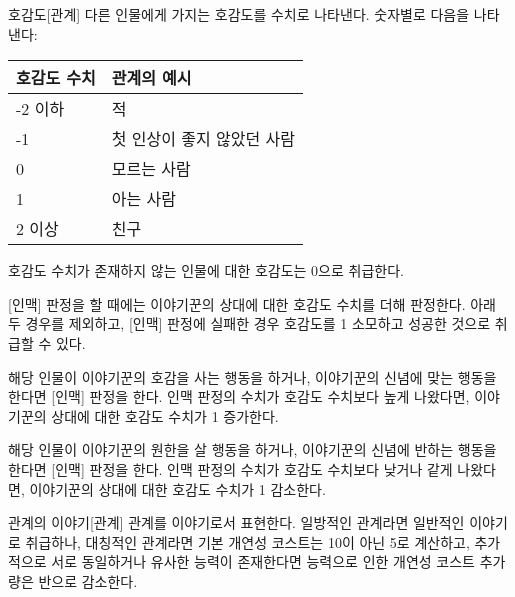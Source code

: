 \documentclass{report}
\begin{document}
	\begin{story}{호감도}{[관계]}
		다른 인물에게 가지는 호감도를 수치로 나타낸다. 숫자별로 다음을 나타낸다:
		
		\begin{tabularx}{\textwidth}{l|X}
			호감도 수치 & 관계의 예시\\
			\hline
			\hline
			-2 이하     & 적\\
			\hline
			-1          & 첫 인상이 좋지 않았던 사람\\
			\hline
			0           & 모르는 사람\\
			\hline
			1           & 아는 사람\\
			\hline
			2 이상      & 친구\\
		\end{tabularx}
		
		호감도 수치가 존재하지 않는 인물에 대한 호감도는 0으로 취급한다.
		
		[인맥] 판정을 할 때에는 이야기꾼의 상대에 대한 호감도 수치를 더해 판정한다. 아래 두 경우를 제외하고, [인맥] 판정에 실패한 경우 호감도를 1 소모하고 성공한 것으로 취급할 수 있다.
		
		해당 인물이 이야기꾼의 호감을 사는 행동을 하거나, 이야기꾼의 신념에 맞는 행동을 한다면 [인맥] 판정을 한다. 인맥 판정의 수치가 호감도 수치보다 높게 나왔다면, 이야기꾼의 상대에 대한 호감도 수치가 1 증가한다.
		
		해당 인물이 이야기꾼의 원한을 살 행동을 하거나, 이야기꾼의 신념에 반하는 행동을 한다면 [인맥] 판정을 한다. 인맥 판정의 수치가 호감도 수치보다 낮거나 같게 나왔다면, 이야기꾼의 상대에 대한 호감도 수치가 1 감소한다.
	\end{story}

	\begin{story}{관계의 이야기}{[관계]}
		관계를 이야기로서 표현한다. 일방적인 관계라면 일반적인 이야기로 취급하나, 대칭적인 관계라면 기본 개연성 코스트는 10이 아닌 5로 계산하고, 추가적으로 서로 동일하거나 유사한 능력이 존재한다면 능력으로 인한 개연성 코스트 추가량은 반으로 감소한다.
	\end{story}
\end{document}
